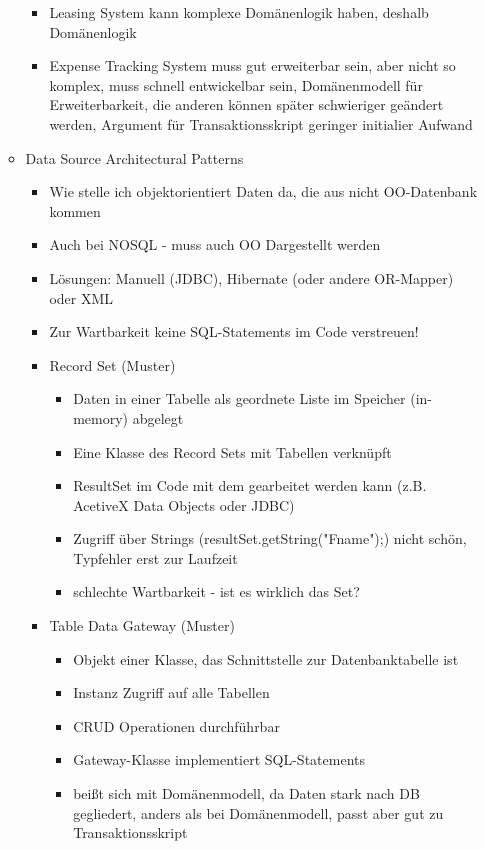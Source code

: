 \documentclass[paper=a4, fontsize=11pt]{scrartcl} %
\numberwithin{equation}{section} %
\numberwithin{figure}{section} %
\numberwithin{table}{section} %
\begin{document}
\begin{itemize}
\begin{itemize}
\begin{itemize}
      \item Leasing System kann komplexe Domänenlogik haben, deshalb Domänenlogik
      \item Expense Tracking System muss gut erweiterbar sein, aber nicht so komplex, muss schnell entwickelbar sein, Domänenmodell für Erweiterbarkeit, die anderen können später schwieriger geändert werden, Argument für Transaktionsskript geringer initialier Aufwand
    \end{itemize}
    \item Data Source Architectural Patterns
    \begin{itemize}
      \item Wie stelle ich objektorientiert Daten da, die aus nicht OO-Datenbank kommen
      \item Auch bei NOSQL - muss auch OO Dargestellt werden
      \item Lösungen: Manuell (JDBC), Hibernate (oder andere OR-Mapper) oder XML
      \item Zur Wartbarkeit keine SQL-Statements im Code verstreuen!
      \item Record Set (Muster)
      \begin{itemize}
        \item Daten in einer Tabelle als geordnete Liste im Speicher (in-memory) abgelegt
        \item Eine Klasse des Record Sets mit Tabellen verknüpft
        \item ResultSet im Code mit dem gearbeitet werden kann (z.B. AcetiveX Data Objects oder JDBC)
        \item Zugriff über Strings (resultSet.getString("Fname");) nicht schön, Typfehler erst zur Laufzeit
        \item schlechte Wartbarkeit - ist es wirklich das Set?
      \end{itemize}
      \item Table Data Gateway (Muster)
      \begin{itemize}
        \item Objekt einer Klasse, das Schnittstelle zur Datenbanktabelle ist
        \item Instanz Zugriff auf alle Tabellen
        \item CRUD Operationen durchführbar
        \item Gateway-Klasse implementiert SQL-Statements
        \item beißt sich mit Domänenmodell, da Daten stark nach DB gegliedert, anders als bei Domänenmodell, passt aber gut zu Transaktionsskript

\end{itemize}
\end{itemize}
\end{itemize}
\end{itemize}
\end{document}
